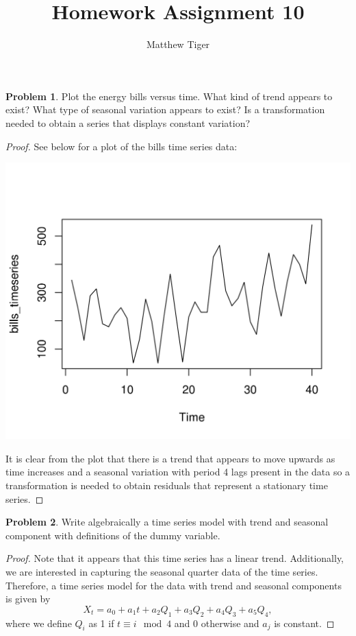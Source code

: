 \documentclass[12pt]{article}
\title{Homework Assignment 10}
\author{Matthew Tiger}
\theoremstyle{definition}
\newtheorem{problem}{Problem}
\begin{document}
\maketitle


\begin{problem}
  Plot the energy bills versus time. What kind of trend appears to exist? What type of seasonal
  variation appears to exist? Is a transformation needed to obtain a series that displays constant
  variation?
\end{problem}

\begin{proof}
  See below for a plot of the bills time series data:
  \vskip 0mm
  \begin{center}
  \includegraphics{timeseries}
  \end{center}
  \vskip 10mm

  It is clear from the plot that there is a trend that appears to move upwards
  as time increases and a seasonal variation with period 4
  lags present in the data so a transformation is needed to obtain residuals
  that represent a stationary time series.
\end{proof}


\begin{problem}
  Write algebraically a time series model with trend and seasonal component with definitions
  of the dummy variable.
\end{problem}

\begin{proof}
  Note that it appears that this time series has a linear trend. Additionally,
  we are interested in capturing the seasonal quarter data of the time series.
  Therefore, a time series model for the data with trend and seasonal components is given by
  \[
    X_t = a_0 + a_1 t + a_2 Q_1 + a_3 Q_2 + a_4 Q_3 + a_5 Q_4,
  \]
  where we define $Q_i$ as 1 if $t \equiv i \mod 4$ and 0 otherwise and $a_j$ is
  constant.
\end{proof}
\end{document}
